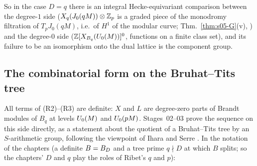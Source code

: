So in the case $D=q$ there is an integral Hecke-equivariant comparison between the degree-$1$ side ($X_q(J_0(qM))\otimes\mathbb{Z}_p$ is a
graded piece of the monodromy filtration of $T_pJ_0(qM)$, i.e.\ of $H^1$ of the modular curve; Thm.~\ref{thm:s05-G}(v), \stcited) and the degree-$0$ side ($\mathbb{Z}[X_{B_q}(U_0(M))]^0$, functions on a
finite class set), and its failure to be an isomorphism onto the dual lattice is the component group.

\subsection{The combinatorial form on the Bruhat--Tits tree}\label{ss:s00-ribet-tree}
All terms of (R2)--(R3) are definite: $X$ and $L$ are degree-zero parts of Brandt modules of $B_q$ at levels $U_0(M)$ and
$U_0(pM)$. Stages~02--03 prove the sequence on this side directly, as a statement about the quotient of a Bruhat--Tits tree by
an $S$-arithmetic group, following the viewpoint of Ihara and Serre \cite[Ch.~II, \S1.4, Thm.~3, Cor.~1, pp.~79--81]{Se}. In the
notation of the chapters (a definite $B=B_D$ and a tree prime $q\nmid D$ at which $B$ splits; so the chapters' $D$ and $q$ play the
roles of Ribet's $q$ and $p$):
